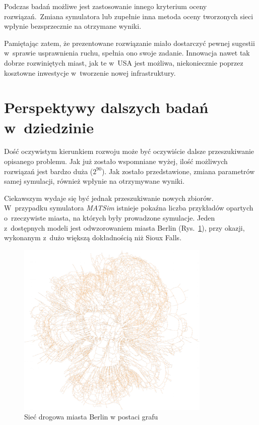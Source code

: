 \documentclass[twoside,12pt]{report}
\begin{document}
Podczas badań możliwe jest zastosowanie innego kryterium oceny rozwiązań.~Zmiana symulatora lub zupełnie inna metoda oceny tworzonych sieci wpłynie bezsprzecznie na otrzymane wyniki.

Pamiętając zatem, że prezentowane rozwiązanie miało  dostarczyć pewnej sugestii w~sprawie usprawnienia ruchu, spełnia ono swoje zadanie. Innowacja nawet tak dobrze rozwiniętych miast, jak te w~USA jest możliwa, niekoniecznie poprzez kosztowne inwestycje w~tworzenie nowej infrastruktury. 

\section{Perspektywy dalszych badań w~dziedzinie}
Dość oczywistym kierunkiem rozwoju może być oczywiście dalsze przeszukiwanie opisanego problemu. Jak już zostało wspomniane wyżej, ilość możliwych rozwiązań jest bardzo duża ($2^{90}$). Jak zostało przedstawione, zmiana parametrów samej symulacji, również wpłynie na otrzymywane wyniki.

Ciekawszym wydaje się być jednak przeszukiwanie nowych zbiorów. W~przypadku symulatora \textit{MATSim} istnieje pokaźna liczba przykładów opartych o~rzeczywiste miasta, na których były prowadzone symulacje. Jeden z~dostępnych modeli jest odwzorowaniem miasta Berlin (Rys.~\ref{fig:berlin}), przy okazji, wykonanym z~dużo większą dokładnością niż Sioux Falls.

\begin{figure}[htbp]
\centering
\includegraphics[width=0.82\textwidth]{img/berlin2}
\caption{Sieć drogowa miasta Berlin w postaci grafu}
\label{fig:berlin}
\end{figure}
\end{document}
